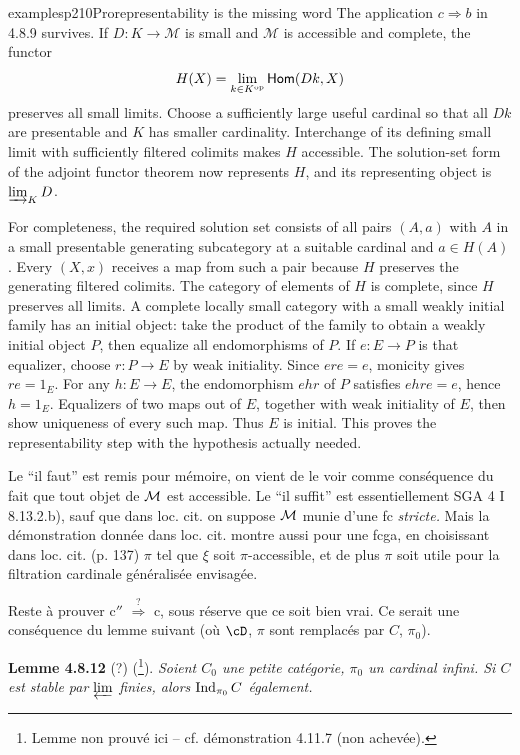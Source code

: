 \begin{dcomment}{examples}{p210}{Prorepresentability is the missing word}
The application $c\Rightarrow b$ in 4.8.9 survives. If $D:K\to\mathcal M$ is small and $\mathcal M$ is accessible and complete, the functor
\[
 H(X)=\lim_{k\in K^{\mathrm{op}}}\mathsf{Hom}(Dk,X)
\]
preserves all small limits. Choose a sufficiently large useful cardinal so that all $Dk$ are presentable and $K$ has smaller cardinality. Interchange of its defining small limit with sufficiently filtered colimits makes $H$ accessible. The solution-set form of the adjoint functor theorem now represents $H$, and its representing object is $\varinjlim_KD$.

For completeness, the required solution set consists of all pairs $(A,a)$ with $A$ in a small presentable generating subcategory at a suitable cardinal and $a\in H(A)$. Every $(X,x)$ receives a map from such a pair because $H$ preserves the generating filtered colimits. The category of elements of $H$ is complete, since $H$ preserves all limits. A complete locally small category with a small weakly initial family has an initial object: take the product of the family to obtain a weakly initial object $P$, then equalize all endomorphisms of $P$. If $e:E\to P$ is that equalizer, choose $r:P\to E$ by weak initiality. Since $ere=e$, monicity gives $re=1_E$. For any $h:E\to E$, the endomorphism $ehr$ of $P$ satisfies $ehre=e$, hence $h=1_E$. Equalizers of two maps out of $E$, together with weak initiality of $E$, then show uniqueness of every such map. Thus $E$ is initial. This proves the representability step with the hypothesis actually needed.
\end{dcomment}


Le ``il faut'' est remis pour mémoire, on vient de le voir comme conséquence du fait que tout objet de $\mathcal{M}$ est accessible. Le ``il suffit'' est essentiellement SGA 4 I 8.13.2.b), sauf que dans loc. cit. on suppose $\mathcal{M}$ munie d'une fc \textit{stricte.} Mais la démonstration donnée dans loc. cit. montre aussi pour une fcga, en choisissant dans loc. cit. (p. 137) $\pi$ tel que $\xi$ soit $\pi$-accessible, et de plus $\pi$ soit utile pour la filtration cardinale généralisée envisagée.

Reste à prouver c$''$ $\overset{?}{\Longrightarrow}$ c, sous réserve que ce soit bien vrai. Ce serait une conséquence du lemme suivant (où $\cD$, $\pi$ sont remplacés par $C$, $\pi_0$).

\textbf{Lemme 4.8.12} (?) (\footnote[88]{Lemme non prouvé ici -- cf. démonstration 4.11.7 (non achevée).}). \textit{Soient $C_0$ une petite catégorie, $\pi_0$ un cardinal infini. Si $C$ est stable par $\varprojlim$ finies, alors $\operatorname{Ind}_{\pi_0}C$ également.} %

